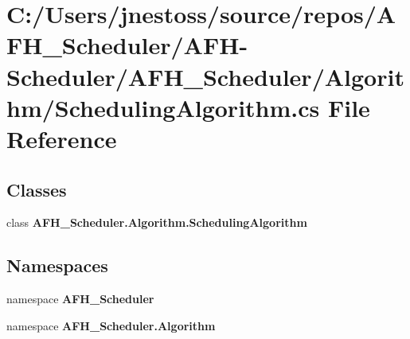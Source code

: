 \section{C\+:/\+Users/jnestoss/source/repos/\+A\+F\+H\+\_\+\+Scheduler/\+A\+F\+H-\/\+Scheduler/\+A\+F\+H\+\_\+\+Scheduler/\+Algorithm/\+Scheduling\+Algorithm.cs File Reference}
\label{_scheduling_algorithm_8cs}
\subsection*{Classes}
\begin{DoxyCompactItemize}
\item 
class \textbf{ A\+F\+H\+\_\+\+Scheduler.\+Algorithm.\+Scheduling\+Algorithm}
\end{DoxyCompactItemize}
\subsection*{Namespaces}
\begin{DoxyCompactItemize}
\item 
namespace \textbf{ A\+F\+H\+\_\+\+Scheduler}
\item 
namespace \textbf{ A\+F\+H\+\_\+\+Scheduler.\+Algorithm}
\end{DoxyCompactItemize}
